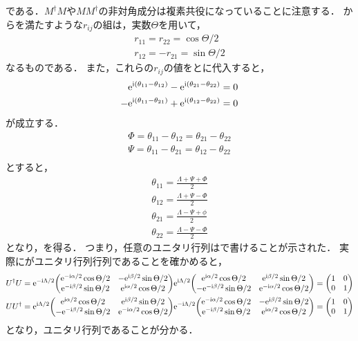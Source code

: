 \documentclass{report}
\begin{document}
    である．$M^{\dag}M$や$MM^{\dag}$の非対角成分は複素共役になっていることに注意する．
    からを満たすような$r_{ij}$の組は，実数$\Theta$を用いて，
    \begin{align}
      r_{11} = r_{22} = \cos\Theta/2 \\ 
      r_{12} = -r_{21} = \sin\Theta/2
    \end{align}
    なるものである．
    また，これらの$r_{ij}$の値をとに代入すると，
    \begin{align}
      \mathrm{e}^{\mathrm{i}(\theta_{11} - \theta_{12})} - \mathrm{e}^{\mathrm{i}(\theta_{21} - \theta_{22})} = 0 \\ 
      -\mathrm{e}^{\mathrm{i}(\theta_{11} - \theta_{21})} + \mathrm{e}^{\mathrm{i}(\theta_{12} - \theta_{22})} = 0
    \end{align}
    が成立する．
    \begin{align}
      \Phi = \theta_{11} - \theta_{12} = \theta_{21} - \theta_{22} \\ 
      \Psi = \theta_{11} - \theta_{21} = \theta_{12} - \theta_{22} \\ 
    \end{align}
    とすると，
    \begin{align}
      \theta_{11} = \frac{\Lambda + \Psi + \Phi}{2} \\ 
      \theta_{12} = \frac{\Lambda + \Psi - \Phi}{2} \\ 
      \theta_{21} = \frac{\Lambda - \Psi + \phi}{2} \\ 
      \theta_{22} = \frac{\Lambda - \Psi - \Phi}{2}
    \end{align}
    となり，を得る．
    つまり，任意のユニタリ行列はで書けることが示された．
    実際にがユニタリ行列行列であることを確かめると，
    \begin{align}
      U^{\dag}U &= \e^{-\i\Lambda/2}\mqty(
        \e^{-\i\alpha / 2}\cos\Theta/2 & -\e^{\i\beta / 2}\sin\Theta/2 \\ 
        \e^{-\i\beta / 2}\sin\Theta/2 & \e^{\i\alpha / 2}\cos\Theta/2
      )
      \e^{\i\Lambda/2}\mqty(
        \e^{\i\alpha / 2}\cos\Theta/2 & \e^{\i\beta / 2}\sin\Theta/2 \\ 
        -\e^{-\i\beta / 2}\sin\Theta/2 & \e^{-\i\alpha / 2}\cos\Theta/2
      )
      = \mqty(1 & 0 \\ 0 & 1) \\ 
      UU^{\dag} &= \e^{\i\Lambda/2}\mqty(
        \e^{\i\alpha / 2}\cos\Theta/2 & \e^{\i\beta / 2}\sin\Theta/2 \\ 
        -\e^{-\i\beta / 2}\sin\Theta/2 & \e^{-\i\alpha / 2}\cos\Theta/2
      )
      \e^{-\i\Lambda/2}\mqty(
        \e^{-\i\alpha / 2}\cos\Theta/2 & -\e^{\i\beta / 2}\sin\Theta/2 \\ 
        \e^{-\i\beta / 2}\sin\Theta/2 & \e^{\i\alpha / 2}\cos\Theta/2
      )
      = \mqty(1 & 0 \\ 0 & 1)
    \end{align}
    となり，ユニタリ行列であることが分かる．
    \par
\end{document}
